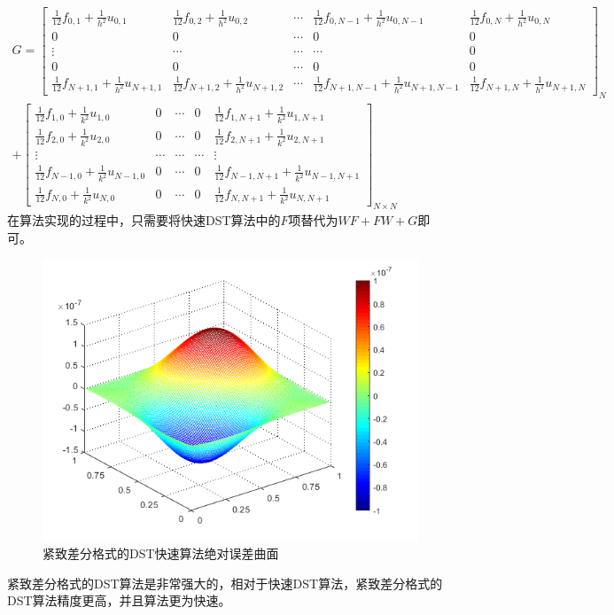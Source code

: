 \documentclass[fontset=mac]{ctexart}
\begin{document}
	$$
	\begin{aligned}
		G = 
		\left[\begin{array}{ccccc}
			\frac{1}{12} f_{0,1}+\frac{1}{h^{2}} u_{0,1} & \frac{1}{12} f_{0,2}+\frac{1}{h^{2}} u_{0,2} & \cdots & \frac{1}{12} f_{0, N-1}+\frac{1}{h^{2}} u_{0, N-1} & \frac{1}{12} f_{0, N}+\frac{1}{h^{2}} u_{0, N} \\
			0 & 0 & \cdots & 0 & 0 \\
			\vdots & \cdots & \cdots & \cdots & 0 \\
			0 & 0 & \cdots & 0 & 0 \\
			\frac{1}{12} f_{N+1,1}+\frac{1}{h^{2}} u_{N+1,1} & \frac{1}{12} f_{N+1,2}+\frac{1}{h^{2}} u_{N+1,2} & \cdots & \frac{1}{12} f_{N+1, N-1}+\frac{1}{h^{2}} u_{N+1, N-1} & \frac{1}{12} f_{N+1, N}+\frac{1}{h^{2}} u_{N+1, N}
		\end{array}\right]_{N} \\ 
		+	\left[\begin{array}{ccccc}
			\frac{1}{12} f_{1,0}+\frac{1}{k^{2}} u_{1,0} & 0 & \cdots & 0 & \frac{1}{12} f_{1, N+1}+\frac{1}{k^{2}} u_{1, N+1} \\
			\frac{1}{12} f_{2,0}+\frac{1}{k^{2}} u_{2,0} & 0 & \cdots & 0 & \frac{1}{12} f_{2, N+1}+\frac{1}{k^{2}} u_{2, N+1} \\
			\vdots & \cdots & \cdots & \cdots & \vdots \\
			\frac{1}{12} f_{N-1,0}+\frac{1}{k^{2}} u_{N-1,0} & 0 & \cdots & 0 & \frac{1}{12} f_{N-1, N+1}+\frac{1}{k^{2}} u_{N-1, N+1} \\
			\frac{1}{12} f_{N, 0}+\frac{1}{k^{2}} u_{N, 0} & 0 & \cdots & 0 & \frac{1}{12} f_{N, N+1}+\frac{1}{k^{2}} u_{N, N+1}
		\end{array}\right]_{N \times N}
	\end{aligned}
	$$
	在算法实现的过程中，只需要将快速DST算法中的$F$项替代为$WF+FW+G$即可。
	\begin{figure}[H]
		\centering
		\includegraphics[width=0.7\linewidth]{fig/pscompact}
		\caption{紧致差分格式的DST快速算法绝对误差曲面}
	\end{figure}
	紧致差分格式的DST算法是非常强大的，相对于快速DST算法，紧致差分格式的DST算法精度更高，并且算法更为快速。
	
\end{document}
